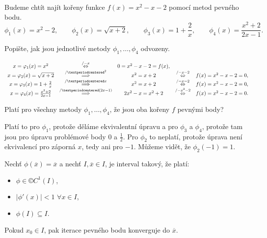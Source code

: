 \documentclass[12pt]{article}                   %
\begin{document}
	Budeme chtít najít kořeny funkce $f(x) = x^2 - x - 2$ pomocí metod pevného bodu.
	$$ \phi_1(x) = x^2 - 2, \qquad \phi_2(x) = \sqrt{x + 2}, \qquad \phi_3(x) = 1 + \frac{2}{x}, \qquad \phi_4(x) = \frac{x^2 + 2}{2x - 1}. $$

\begin{priklad}[4.1]
	Popište, jak jsou jednotlivé metody $\phi_1, …, \phi_4$ odvozeny.

	\begin{reseni}
		$$\begin{array}{c c c c c}
			x = \phi_1(x) = x^2 &\overset{/-x}{\Leftrightarrow}& 0 = x^2 - x - 2 = f(x), && \\
			x = \phi_2(x) = \sqrt{x + 2} &\overset{/·^2}{\implies}& x^2 = x + 2 &\overset{/-x-2}{\Leftrightarrow}& f(x) = x^2 - x - 2 = 0, \\
			x = \phi_3(x) = 1 + \frac{2}{x} &\overset{/·x}{\implies}& x^2 = x + 2 &\overset{/-x-2}{\Leftrightarrow}& f(x) = x^2 - x - 2 = 0, \\
			x = \phi_4(x) = \frac{x^2 + 2}{2x - 1} &\overset{/·(2x - 1)}{\implies}& 2x^2 - x = x^2 + 2 &\overset{/-x^2-2}{\Leftrightarrow}& f(x) = x^2 - x - 2 = 0. \\
		\end{array}$$
	\end{reseni}
\end{priklad}

\begin{priklad}[4.2]
	Platí pro všechny metody $\phi_1, …, \phi_4$, že jsou oba kořeny $f$ pevnými body?

	\begin{reseni}
		Platí to pro $\phi_1$, protože děláme ekvivalentní úpravu a pro $\phi_3$ a $\phi_4$, protože tam jsou pro úpravu problémové body $0$ a $\frac{1}{2}$. Pro $\phi_2$ to neplatí, protože úprava není ekvivalencí pro záporná $x$, tedy ani pro $-1$. Můžeme vidět, že $\phi_2(-1) = 1$.
	\end{reseni}
\end{priklad}

\begin{veta}
	Nechť $\phi(\overline x) = \overline x$ a nechť $I, \overline x \in I$, je interval takový, že platí:
	\begin{itemize}
		\item $\phi \in ©C^1(I)$,
		\item $|\phi'(x)| < 1$ $\forall x \in I$,
		\item $\phi(I) \subseteq I$.
	\end{itemize}
	Pokud $x_0 \in I$, pak iterace pevného bodu konverguje do $\overline x$.
\end{veta}
\end{document}
